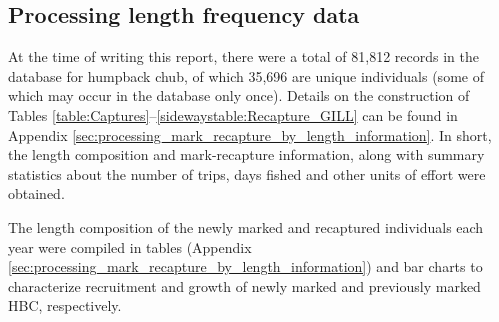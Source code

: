 


\subsection{Processing length frequency data} %
\label{sub:processing_length_frequency_data}
At the time of writing this report, there were a total of 81,812 records in the database for humpback chub, of which 35,696 are unique individuals (some of which may occur in the database only once).  Details on the construction of Tables \ref{table:Captures}--\ref{sidewaystable:Recapture_GILL} can be found in Appendix \ref{sec:processing_mark_recapture_by_length_information}. In short, the length composition and mark-recapture information, along with summary statistics about the number of trips, days fished and other units of effort were obtained.

The length composition of the newly marked and recaptured individuals each year were compiled in tables (Appendix \ref{sec:processing_mark_recapture_by_length_information}) and bar charts to characterize recruitment and growth of newly marked and previously marked HBC, respectively.









